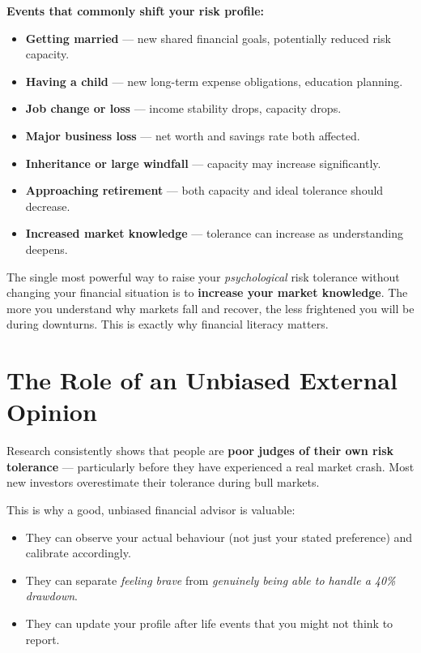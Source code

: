 \documentclass[12pt,a4paper]{article}
\begin{document}
\textbf{Events that commonly shift your risk profile:}
\begin{itemize}
  \item \textbf{Getting married} --- new shared financial goals, potentially reduced risk capacity.
  \item \textbf{Having a child} --- new long-term expense obligations, education planning.
  \item \textbf{Job change or loss} --- income stability drops, capacity drops.
  \item \textbf{Major business loss} --- net worth and savings rate both affected.
  \item \textbf{Inheritance or large windfall} --- capacity may increase significantly.
  \item \textbf{Approaching retirement} --- both capacity and ideal tolerance should decrease.
  \item \textbf{Increased market knowledge} --- tolerance can increase as understanding deepens.
\end{itemize}

\vspace{2mm}

\begin{keybox}
The single most powerful way to raise your \textit{psychological} risk tolerance without changing your financial situation is to \textbf{increase your market knowledge}. The more you understand why markets fall and recover, the less frightened you will be during downturns. This is exactly why financial literacy matters.
\end{keybox}

\section{The Role of an Unbiased External Opinion}

Research consistently shows that people are \textbf{poor judges of their own risk tolerance} --- particularly before they have experienced a real market crash. Most new investors overestimate their tolerance during bull markets.

This is why a good, unbiased financial advisor is valuable:
\begin{itemize}
  \item They can observe your actual behaviour (not just your stated preference) and calibrate accordingly.
  \item They can separate \textit{feeling brave} from \textit{genuinely being able to handle a 40\% drawdown}.
  \item They can update your profile after life events that you might not think to report.
\end{itemize}
\end{document}

